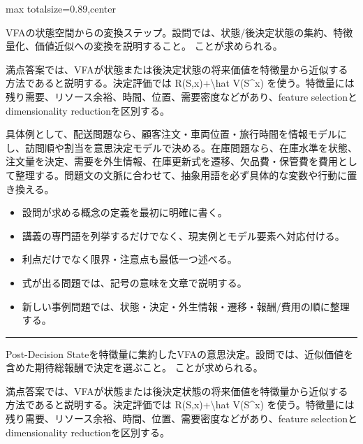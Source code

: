 \begin{minipage}[t]{0.58\textwidth}
\begin{adjustbox}{max totalsize={\textwidth}{0.89\textheight},center}
\begin{minipage}{\textwidth}
\end{minipage}
\end{adjustbox}
\end{minipage}

\clearpage{}
VFAの状態空間からの変換ステップ。設問では、状態/後決定状態の集約、特徴量化、価値近似への変換を説明すること。 ことが求められる。\par
{}
満点答案では、VFAが状態または後決定状態の将来価値を特徴量から近似する方法であると説明する。決定評価では R(S,x)+\textbackslash{}hat V(S\textasciicircum{}x) を使う。特徴量には残り需要、リソース余裕、時間、位置、需要密度などがあり、feature selectionとdimensionality reductionを区別する。\par
{}
具体例として、配送問題なら、顧客注文・車両位置・旅行時間を情報モデルにし、訪問順や割当を意思決定モデルで決める。在庫問題なら、在庫水準を状態、注文量を決定、需要を外生情報、在庫更新式を遷移、欠品費・保管費を費用として整理する。問題文の文脈に合わせて、抽象用語を必ず具体的な変数や行動に置き換える。\par
{}
\begin{itemize}
\item 設問が求める概念の定義を最初に明確に書く。
\item 講義の専門語を列挙するだけでなく、現実例とモデル要素へ対応付ける。
\item 利点だけでなく限界・注意点も最低一つ述べる。
\item 式が出る問題では、記号の意味を文章で説明する。
\item 新しい事例問題では、状態・決定・外生情報・遷移・報酬/費用の順に整理する。
\end{itemize}
\vspace{2mm}\hrule\vspace{2mm}
Post-Decision Stateを特徴量に集約したVFAの意思決定。設問では、近似価値を含めた期待総報酬で決定を選ぶこと。 ことが求められる。\par
{}
満点答案では、VFAが状態または後決定状態の将来価値を特徴量から近似する方法であると説明する。決定評価では R(S,x)+\textbackslash{}hat V(S\textasciicircum{}x) を使う。特徴量には残り需要、リソース余裕、時間、位置、需要密度などがあり、feature selectionとdimensionality reductionを区別する。\par
{}
